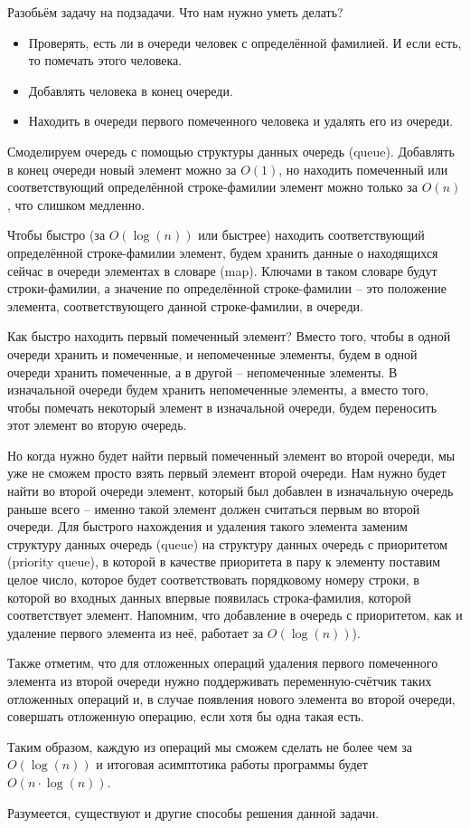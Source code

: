 \solutionSection

Разобьём задачу на подзадачи. Что нам нужно уметь делать?

\begin{itemize}
\item Проверять, есть ли в очереди человек с определённой фамилией. И если есть, то помечать этого человека.
\item Добавлять человека в конец очереди.
\item Находить в очереди первого помеченного человека и удалять его из очереди.
\end{itemize}

Смоделируем очередь с помощью структуры данных очередь (queue). Добавлять в конец очереди новый элемент можно за $O(1)$, но находить помеченный или соответствующий определённой строке-фамилии элемент можно только за $O(n)$, что слишком медленно.

Чтобы быстро (за $O(\log(n))$ или быстрее) находить соответствующий определённой строке-фамилии элемент, будем хранить данные о находящихся сейчас в очереди элементах в словаре (map). Ключами в таком словаре будут строки-фамилии, а значение по определённой строке-фамилии -- это положение элемента, соответствующего данной строке-фамилии, в очереди.

Как быстро находить первый помеченный элемент? Вместо того, чтобы в одной очереди хранить и помеченные, и непомеченные элементы, будем в одной очереди хранить помеченные, а в другой -- непомеченные элементы. В изначальной очереди будем хранить непомеченные элементы, а вместо того, чтобы помечать некоторый элемент в изначальной очереди, будем переносить этот элемент во вторую очередь.

Но когда нужно будет найти первый помеченный элемент во второй очереди, мы уже не сможем просто взять первый элемент второй очереди. Нам нужно будет найти во второй очереди элемент, который был добавлен в изначальную очередь раньше всего -- именно такой элемент должен считаться первым во второй очереди. Для быстрого нахождения и удаления такого элемента заменим структуру данных очередь (queue) на структуру данных очередь с приоритетом (priority queue), в которой в качестве приоритета в пару к элементу поставим целое число, которое будет соответствовать порядковому номеру строки, в которой во входных данных впервые появилась строка-фамилия, которой соответствует элемент. Напомним, что добавление в очередь с приоритетом, как и удаление первого элемента из неё, работает за $O(\log(n))$).

Также отметим, что для отложенных операций удаления первого помеченного элемента из второй очереди нужно поддерживать переменную-счётчик таких отложенных операций и, в случае появления нового элемента во второй очереди, совершать отложенную операцию, если хотя бы одна такая есть.

Таким образом, каждую из операций мы сможем сделать не более чем за $O(\log(n))$ и итоговая асимптотика работы программы будет $O(n \cdot \log(n))$.

Разумеется, существуют и другие способы решения данной задачи.

\codeExample

{}
